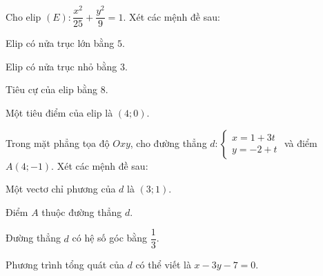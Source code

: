 
\NQuestion Cho elip $(E):\dfrac{x^2}{25}+\dfrac{y^2}{9}=1$. Xét các mệnh đề sau:

\begin{SubQuestions}
\item Elip có nửa trục lớn bằng $5$.
\item Elip có nửa trục nhỏ bằng $3$.
\item Tiêu cự của elip bằng $8$.
\item Một tiêu điểm của elip là $(4;0)$.
\end{SubQuestions}

\NQuestion Trong mặt phẳng tọa độ $Oxy$, cho đường thẳng $d: \begin{cases}x=1+3t\\y=-2+t\end{cases}$ và điểm $A(4;-1)$. Xét các mệnh đề sau:

\begin{SubQuestions}
\item Một vectơ chỉ phương của $d$ là $(3;1)$.
\item Điểm $A$ thuộc đường thẳng $d$.
\item Đường thẳng $d$ có hệ số góc bằng $\dfrac{1}{3}$.
\item Phương trình tổng quát của $d$ có thể viết là $x-3y-7=0$.
\end{SubQuestions}
